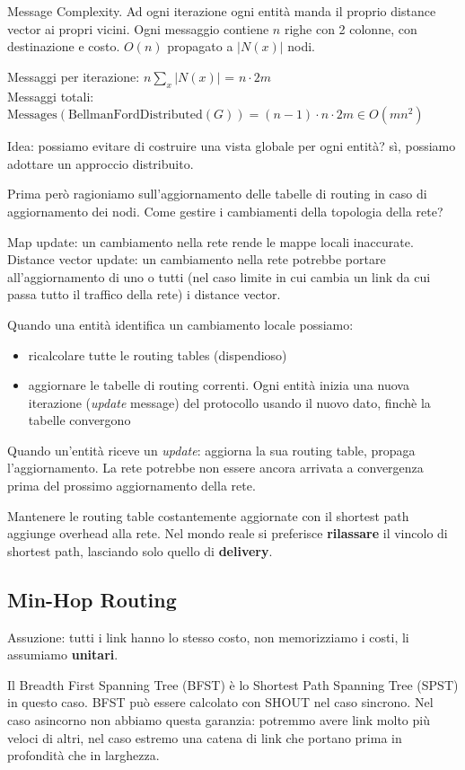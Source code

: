 Message Complexity. Ad ogni iterazione ogni entità manda il proprio distance vector ai propri vicini.
Ogni messaggio contiene $n$ righe con 2 colonne, con destinazione e costo. $O(n)$ propagato a $|N(x)|$ nodi.

Messaggi per iterazione: $n \sum_x |N(x)|$ = $n \cdot 2m$\\
Messaggi totali: $\text{Messages}(\text{BellmanFordDistributed}(G)) = (n-1) \cdot n \cdot 2m \in O(m n^2)$

Idea: possiamo evitare di costruire una vista globale per ogni entità? sì, possiamo adottare un approccio distribuito.

Prima però ragioniamo sull'aggiornamento delle tabelle di routing in caso di aggiornamento dei nodi. Come gestire i cambiamenti della topologia della rete?

Map update: un cambiamento nella rete rende le mappe locali inaccurate.\\
Distance vector update: un cambiamento nella rete potrebbe portare all'aggiornamento di uno o tutti (nel caso limite in cui cambia un link
da cui passa tutto il traffico della rete) i distance vector.

Quando una entità identifica un cambiamento locale possiamo:
\begin{itemize}
 \item ricalcolare tutte le routing tables (dispendioso)
 \item aggiornare le tabelle di routing correnti. Ogni entità inizia una nuova iterazione (\textit{update} message) del protocollo usando il nuovo dato, finchè la tabelle convergono
\end{itemize}

Quando un'entità riceve un \textit{update}: aggiorna la sua routing table, propaga l'aggiornamento.
La rete potrebbe non essere ancora arrivata a convergenza prima del prossimo aggiornamento della rete.

Mantenere le routing table costantemente aggiornate con il shortest path aggiunge overhead alla rete. Nel mondo reale si preferisce
\textbf{rilassare} il vincolo di shortest path, lasciando solo quello di \textbf{delivery}.

\subsection{Min-Hop Routing}
Assuzione: tutti i link hanno lo stesso costo, non memorizziamo i costi, li assumiamo \textbf{unitari}.

Il Breadth First Spanning Tree (BFST) è lo Shortest Path Spanning Tree (SPST) in questo caso. BFST può essere calcolato con SHOUT nel caso sincrono.
Nel caso asincorno non abbiamo questa garanzia: potremmo avere link molto più veloci di altri, nel caso estremo una catena di link che
portano prima in profondità che in larghezza.

